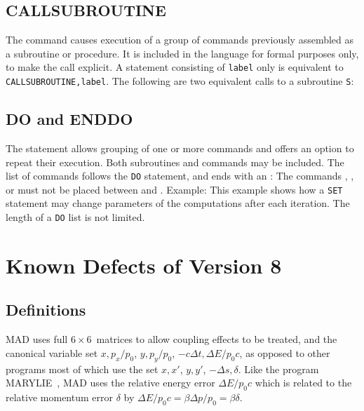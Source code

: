 \section{CALLSUBROUTINE}
\label{S-CALLSUB}
The  command causes execution of a group
of commands previously assembled as a subroutine or procedure.
It is included in the language for formal purposes only,
to make the call explicit.
A statement consisting of {\tt label} only is
equivalent to {\tt CALLSUBROUTINE,label}.
The following are two equivalent calls to a subroutine {\tt S}:
 
\section{DO and ENDDO}
\label{S-DO}
The  statement allows grouping of one or more commands
and offers an option to repeat their execution.
Both subroutines and commands may be included.
The list of commands follows the {\tt DO} statement,
and ends with an :
\myxmp{
DO,TIMES = integer] \\
xxx\=\kill
   \>\{command\} \\
ENDDO
}
The commands , ,
or  must not be placed between  and .
Example:
This example shows how a {\tt SET} statement may change
parameters of the computations after each iteration.
The length of a {\tt DO} list is not limited.
 
\chapter{Known Defects of Version 8}
 
\section{Definitions}
MAD uses full \(6 \times 6\)~matrices to allow coupling effects to
be treated, and the canonical variable set
\(x, p_x/p_0\), \(y, p_y/p_0\), \(-c \Delta t, \Delta E/p_0 c\),
as opposed to other programs most of which use the set
\(x, x'\), \(y, y'\), \(- \Delta s, \delta\).
Like the program MARYLIE~\cite{B-DRA81},
MAD uses the relative energy error
\(\Delta E / p_0 c\)
which is related to the relative momentum error \(\delta\) by
\(\Delta E / p_0 c = \beta \Delta p / p_0 = \beta \delta\).
 
